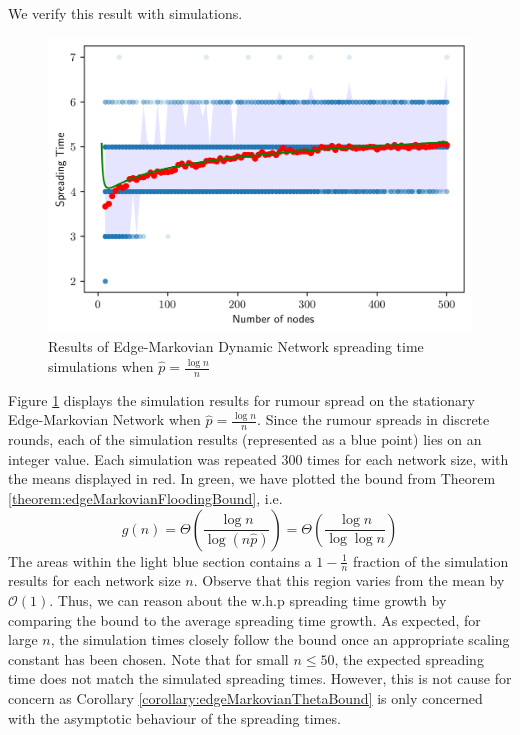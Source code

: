 We verify this result with simulations.

\begin{figure}[h]
	\centering
	\includegraphics[width=1\textwidth]{./figures/flooding_simulation_min_p_with_error.png}
	\caption{Results of Edge-Markovian Dynamic Network spreading time simulations when $\hat{p} = \frac{\log n}{n}$}
	\label{fig:floodingGnpSimResultsTight}
\end{figure}

Figure \ref{fig:floodingGnpSimResultsTight} displays the simulation results for rumour spread on the stationary Edge-Markovian Network when $\hat{p} = \frac{\log n}{n}$.
Since the rumour spreads in discrete rounds, each of the simulation results (represented as a blue point) lies on an integer value. Each simulation was repeated 300 times for each network size, with the means displayed in red. In green, we have plotted the bound from Theorem \ref{theorem:edgeMarkovianFloodingBound}, i.e.
$$
	g(n) 
	= \Theta\left(\frac{\log n}{\log (n\hat{p})}\right) 
	= \Theta\left(\frac{\log n}{\log \log n}\right)
$$
The areas within the light blue section contains a $1-\frac{1}{n}$ fraction of the simulation results for each network size $n$. Observe that this region varies from the mean by $\mathcal{O}(1)$. Thus, we can reason about the w.h.p spreading time growth by comparing the bound to the average spreading time growth. 
As expected, for large $n$, the simulation times closely follow the bound once an appropriate scaling constant has been chosen. Note that for small $n \leq 50$, the expected spreading time does not match the simulated spreading times. However, this is not cause for concern as Corollary \ref{corollary:edgeMarkovianThetaBound} is only concerned with the asymptotic behaviour of the spreading times. %


